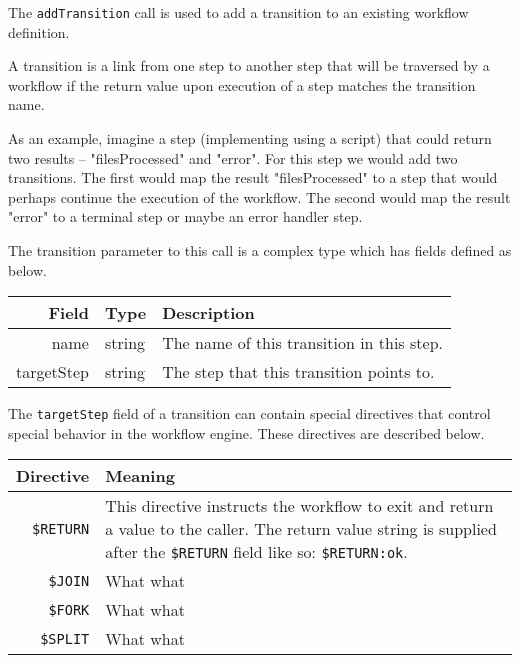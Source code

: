 The \verb+addTransition+ call is used to add a transition to an existing workflow definition.

A transition is a link from one step to another step that will be traversed by a workflow if
the return value upon execution of a step matches the transition name.

As an example, imagine a step (implementing using a \Reflex script) that could return two results --
"filesProcessed" and "error". For this step we would add two transitions. The first would map the result
"filesProcessed" to a step that would perhaps continue the execution of the workflow. The second would map the
result "error" to a terminal step or maybe an error handler step.

The transition parameter to this call is a complex type which has fields defined as below.

\begin{table}[h]
\begin{center}
\begin{tabular}{r l p{8cm}}
  Field & Type & Description \\
  \hline
  name & string & The name of this transition in this step.\\
  targetStep & string & The step that this transition points to.\\
\end{tabular}
\end{center}
\end{table}

The \verb+targetStep+ field of a transition can contain special directives that control
special behavior in the workflow engine. These directives are described below.

\begin{table}[h]
\begin{center}
\begin{tabular}{r p{8cm}}
  Directive & Meaning \\
  \hline
  \verb+$RETURN+ & This directive instructs the workflow to exit and return a value to
     the caller. The return value string is supplied after the \verb+$RETURN+ field like so:
     \verb+$RETURN:ok+. \\
  \verb+$JOIN+ & What what \\
  \verb+$FORK+ & What what \\
  \verb+$SPLIT+ & What what \\

\end{tabular}
\end{center}
\end{table}
